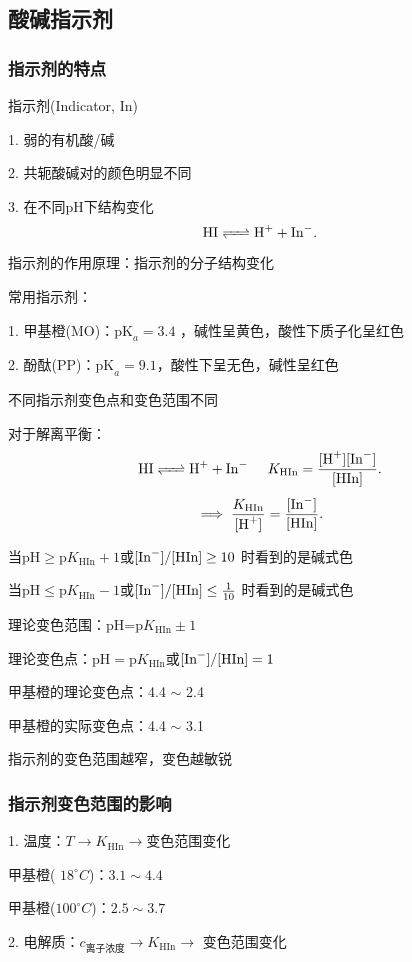 \subsection{酸碱指示剂}%
\label{sub:酸碱指示剂}
\subsubsection{指示剂的特点}%
\label{subsub:示剂的特点-}
指示剂(Indicator, In)

1. 弱的有机酸/碱

2. 共轭酸碱对的颜色明显不同

3. 在不同pH下结构变化
\[
    \ce{HI <=> H+ +In-}
.\] 
\begin{notation}
    指示剂的作用原理：指示剂的分子结构变化
\end{notation}
\begin{eg}
    常用指示剂：

    1. 甲基橙(MO)：$\text{pK}_a=3.4$ ，碱性呈黄色，酸性下质子化呈红色

    2. 酚酞(PP)：$\text{pK}_a=9.1$，酸性下呈无色，碱性呈红色
\end{eg}
\begin{notation}
    不同指示剂变色点和变色范围不同
\end{notation}
对于解离平衡：
\[
    \ce{HI <=> H+ +In-} \hspace{0.5cm} K_{\text{HIn}}=\frac{[\ce{H+}][\ce{In-}]}{[\text{HIn}]}
.\] 
\[
    \implies \frac{K_{\text{HIn}}}{[\ce{H+}]}=\frac{[\ce{In-}]}{[\text{HIn}]}
.\] 

当$\text{pH}\ge \text{p}K_{\text{HIn}}+1$或$[\ce{In-}] / [\text{HIn}]\ge 10$ 时看到的是碱式色

当$\text{pH}\le  \text{p}K_{\text{HIn}}-1$或$[\ce{In-}] / [\text{HIn}]\le  \frac{1}{10}$ 时看到的是碱式色

\begin{notation}
    理论变色范围：pH=$\text{p}K_{\text{HIn}}\pm 1$

    理论变色点：$\text{pH}= \text{p}K_{\text{HIn}}$或$[\ce{In-}] / [\text{HIn}]=1$

    甲基橙的理论变色点：4.4 $\sim $ 2.4

    甲基橙的实际变色点：4.4 $\sim $ 3.1
\end{notation}
\begin{notation}
    指示剂的变色范围越窄，变色越敏锐
\end{notation}
\subsubsection{指示剂变色范围的影响}%
\label{subsub:指示剂变色范围的影响}
1. 温度：$T\to K_{\text{HIn}}\to $变色范围变化
\begin{eg}
    甲基橙( $18^\circ C$)：$3.1\sim 4.4$ 

    甲基橙($100^\circ C$)：$2.5\sim 3.7$
\end{eg}
2. 电解质：$c_\text{离子浓度}\to K_{\text{HIn}}\to$ 变色范围变化

